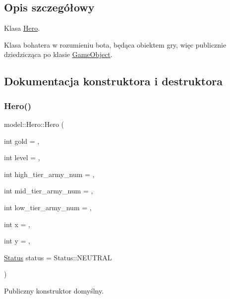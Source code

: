 \subsection{Opis szczegółowy}
Klasa \hyperlink{classmodel_1_1Hero}{Hero}. 

Klasa bohatera w rozumieniu bota, będąca obiektem gry, więc publicznie dziedzicząca po klasie \hyperlink{classmodel_1_1GameObject}{Game\+Object}. 

\subsection{Dokumentacja konstruktora i destruktora}
\mbox{\label{classmodel_1_1Hero_aeff27a625ef4629d57d2dba7497eb559}} 
\subsubsection{\texorpdfstring{Hero()}{Hero()}\hspace{0.1cm}{\footnotesize\ttfamily [1/2]}}
{\footnotesize\ttfamily model\+::\+Hero\+::\+Hero (\begin{DoxyParamCaption}\item[{int}]{gold = {},  }\item[{int}]{level = {},  }\item[{int}]{high\+\_\+tier\+\_\+army\+\_\+num = {},  }\item[{int}]{mid\+\_\+tier\+\_\+army\+\_\+num = {},  }\item[{int}]{low\+\_\+tier\+\_\+army\+\_\+num = {},  }\item[{int}]{x = {},  }\item[{int}]{y = {},  }\item[{\hyperlink{status_8hpp_a822822ece62ee330ee656034849df887}{Status}}]{status = {\ttfamily Status\+:\+:NEUTRAL} }\end{DoxyParamCaption})\hspace{0.3cm}{\ttfamily [inline]}}



Publiczny konstruktor domyślny. 


